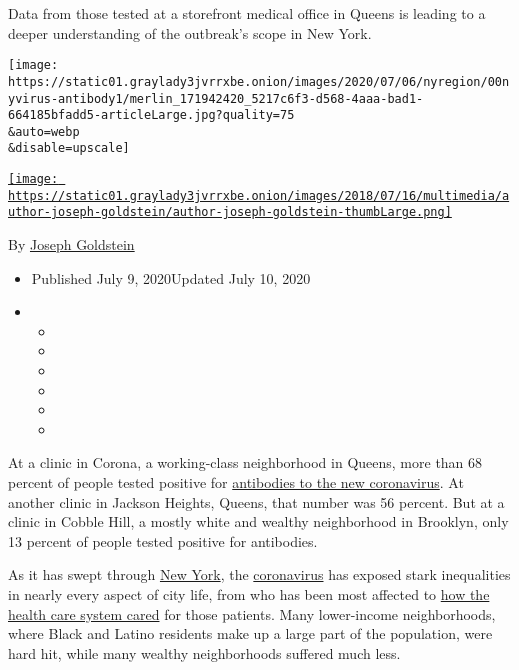Data from those tested at a storefront medical office in Queens is
leading to a deeper understanding of the outbreak's scope in New York.

\texttt{[image: https://static01.graylady3jvrrxbe.onion/images/2020/07/06/nyregion/00nyvirus-antibody1/merlin\_171942420\_5217c6f3-d568-4aaa-bad1-664185bfadd5-articleLarge.jpg?quality=75\\\&auto=webp\\\&disable=upscale]}

\href{https://www.nytimes3xbfgragh.onion/by/joseph-goldstein}{\texttt{[image: https://static01.graylady3jvrrxbe.onion/images/2018/07/16/multimedia/author-joseph-goldstein/author-joseph-goldstein-thumbLarge.png]}}

By \href{https://www.nytimes3xbfgragh.onion/by/joseph-goldstein}{Joseph
Goldstein}

\begin{itemize}
\item
  Published July 9, 2020Updated July 10, 2020
\item
  \begin{itemize}
  \item
  \item
  \item
  \item
  \item
  \item
  \end{itemize}
\end{itemize}

At a clinic in Corona, a working-class neighborhood in Queens, more than
68 percent of people tested positive for
\href{https://www.nytimes3xbfgragh.onion/2020/08/20/nyregion/nyc-coronavirus-antibody-testing.html}{antibodies
to the new coronavirus}. At another clinic in Jackson Heights, Queens,
that number was 56 percent. But at a clinic in Cobble Hill, a mostly
white and wealthy neighborhood in Brooklyn, only 13 percent of people
tested positive for antibodies.

As it has swept through
\href{https://www.nytimes3xbfgragh.onion/2020/07/23/nyregion/coronavirus-testing-nyc.html}{New
York}, the
\href{https://www.nytimes3xbfgragh.onion/2020/07/23/nyregion/coronavirus-testing-nyc.html}{coronavirus}
has exposed stark inequalities in nearly every aspect of city life, from
who has been most affected to
\href{https://www.nytimes3xbfgragh.onion/2020/07/01/nyregion/Coronavirus-hospitals.html}{how
the health care system cared} for those patients. Many lower-income
neighborhoods, where Black and Latino residents make up a large part of
the population, were hard hit, while many wealthy neighborhoods suffered
much less.

